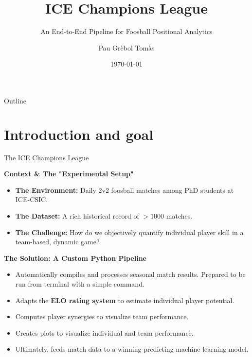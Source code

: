 \documentclass[10pt, aspectratio=169]{beamer}
\title[ICE Champions League]{ICE Champions League}
\subtitle{An End-to-End Pipeline for Foosball Positional Analytics}
\author{Pau Grèbol Tomàs}
\institute[ICE-CSIC/IEEC]{\href{mailto:grebol@ice.csic.es}{grebol@ice.csic.es} \\ ICE-CSIC/IEEC}
\date{\today}
\begin{document}
\begin{frame}
    \titlepage
\end{frame}

\begin{frame}{Outline}
    \tableofcontents
\end{frame}

\section{Introduction and goal}

\begin{frame}{The ICE Champions League}
\fontsize{7pt}{9pt}\selectfont


    \textbf{Context \& The "Experimental Setup"}
    \begin{itemize}
        \item \textbf{The Environment:} Daily 2v2 foosball matches among PhD students at ICE-CSIC.
        \item \textbf{The Dataset:} A rich historical record of $>1000$ matches.
        \item \textbf{The Challenge:} How do we objectively quantify individual player skill in a team-based, dynamic game?
    \end{itemize}

    \vspace{0.8em}

    \textbf{The Solution: A Custom Python Pipeline}
    \begin{itemize}
        \item Automatically compiles and processes seasonal match results. Prepared to be run from terminal with a simple command.
        \item Adapts the \textbf{ELO rating system} to estimate individual player potential.
        \item Computes player synergies to visualize team performance.
        \item Creates plots to visualize individual and team performance.
        \item Ultimately, feeds match data to a winning-predicting machine learning model.
    \end{itemize}

    \vspace{0.8em}


\end{frame}
\end{document}
